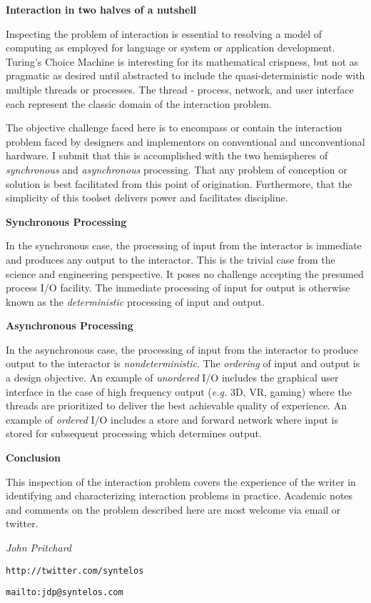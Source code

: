 

\bf Interaction in two halves of a nutshell

\bigskip

\rm

Inspecting the problem of interaction is essential to resolving a
model of computing as employed for language or system or application
development.  Turing's Choice Machine is interesting for its
mathematical crispness, but not as pragmatic as desired until
abstracted to include the quasi-deterministic node with multiple
threads or processes.  The thread - process, network, and user
interface each represent the classic domain of the interaction
problem.

The objective challenge faced here is to encompass or contain the
interaction problem faced by designers and implementors on
conventional and unconventional hardware.  I submit that this is
accomplished with the two hemispheres of {\it synchronous} and {\it
asynchronous} processing.  That any problem of conception or solution
is best facilitated from this point of origination.  Furthermore, that
the simplicity of this toolset delivers power and facilitates
discipline.

\medskip

{\bf Synchronous Processing}

\medskip

In the synchronous case, the processing of input from the interactor
is immediate and produces any output to the interactor.  This is the
trivial case from the science and engineering perspective.  It poses
no challenge accepting the presumed process I/O facility.  The
immediate processing of input for output is otherwise known as the
{\it deterministic} processing of input and output.

\medskip

{\bf Asynchronous Processing}

\medskip

In the asynchronous case, the processing of input from the interactor
to produce output to the interactor is {\it nondeterministic}.  The
{\it ordering} of input and output is a design objective.  An example
of {\it unordered} I/O includes the graphical user interface in the
case of high frequency output ({\it e.g.} 3D, VR, gaming) where the
threads are prioritized to deliver the best achievable quality of
experience.  An example of {\it ordered} I/O includes a store and
forward network where input is stored for subsequent processing which
determines output.

\medskip

{\bf Conclusion}

\medskip

This inspection of the interaction problem covers the experience of
the writer in identifying and characterizing interaction problems in
practice.  Academic notes and comments on the problem described here
are most welcome via email or twitter.

\bigskip

{\it John Pritchard}

{\tt http://twitter.com/syntelos}

{\tt mailto:jdp@syntelos.com}

\bye

